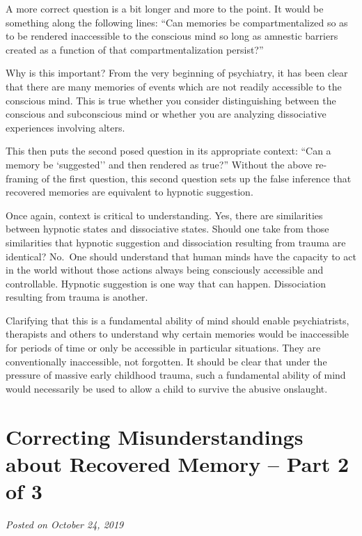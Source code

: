 \documentclass[]{book}
\begin{document}
A more correct question is a bit longer and more to the point. It would be something along the following lines: ``Can memories be compartmentalized so as to be rendered inaccessible to the conscious mind so long as amnestic barriers created as a function of that compartmentalization persist?''

Why is this important? From the very beginning of psychiatry, it has been clear that there are many memories of events which are not readily accessible to the conscious mind. This is true whether you consider distinguishing between the conscious and subconscious mind or whether you are analyzing dissociative experiences involving alters.

This then puts the second posed question in its appropriate context: ``Can a memory be `suggested'' and then rendered as true?'' Without the above re-framing of the first question, this second question sets up the false inference that recovered memories are equivalent to hypnotic suggestion.

Once again, context is critical to understanding. Yes, there are similarities between hypnotic states and dissociative states. Should one take from those similarities that hypnotic suggestion and dissociation resulting from trauma are identical? No.~One should understand that human minds have the capacity to act in the world without those actions always being consciously accessible and controllable. Hypnotic suggestion is one way that can happen. Dissociation resulting from trauma is another.

Clarifying that this is a fundamental ability of mind should enable psychiatrists, therapists and others to understand why certain memories would be inaccessible for periods of time or only be accessible in particular situations. They are conventionally inaccessible, not forgotten. It should be clear that under the pressure of massive early childhood trauma, such a fundamental ability of mind would necessarily be used to allow a child to survive the abusive onslaught.

\hypertarget{correcting-misunderstandings-about-recovered-memory-part-2-of-3}{%
\section{Correcting Misunderstandings about Recovered Memory -- Part 2 of 3}\label{correcting-misunderstandings-about-recovered-memory-part-2-of-3}}

\emph{Posted on October 24, 2019}
\end{document}
